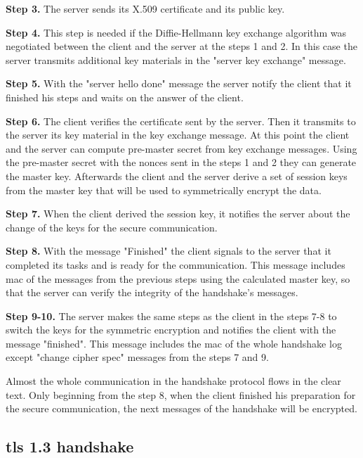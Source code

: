 \textbf{Step 3.} The server sends its X.509 certificate and its public key.

\textbf{Step 4.} This step is needed if the Diffie-Hellmann key exchange algorithm was negotiated between the client and the server at the steps 1 and 2. In this case the server transmits additional key materials in the "server key exchange" message.

\textbf{Step 5.} With the "server hello done" message the server notify the client that it finished his steps and waits on the answer of the client.

\textbf{Step 6.} The client verifies the certificate sent by the server. Then it transmits to the server its key material in the key exchange message. 
At this point the client and the server can compute pre-master secret from key exchange messages. Using the pre-master secret with the nonces sent in the steps 1 and 2 they can generate the master key. Afterwards the client and the server derive a set of session keys from the master key that will be used to symmetrically encrypt the data.

\textbf{Step 7.} When the client derived the session key, it notifies the server about the change of the keys for the secure communication.

\textbf{Step 8.} With the message "Finished" the client signals to the server that it completed its tasks and is ready for the communication. This message includes \gls{mac} of the messages from the previous steps using the calculated master key, so that the server can verify the integrity of the handshake's messages.

\textbf{Step 9-10.} The server makes the same steps as the client in the steps 7-8 to switch the keys for the symmetric encryption and notifies the client with the message "finished". This message includes the \gls{mac} of the whole handshake log except "change cipher spec" messages from the steps 7 and 9. \cite{sslstore:handshake}\cite{Hassenstein}

Almost the whole communication in the handshake protocol flows in the clear text. Only beginning from the step 8, when the client finished his preparation for the secure communication, the next messages of the handshake will be encrypted.

\subsection{\gls{tls} 1.3 handshake}
\label{subsec:handshake1_3}


